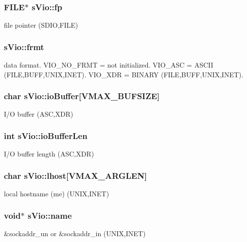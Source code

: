 \subsubsection[{fp}]{\setlength{\rightskip}{0pt plus 5cm}F\+I\+L\+E$\ast$ s\+Vio\+::fp}\label{a00002_a6ac2f825edaf90c684faebbb17ad67d4}
file pointer (S\+D\+I\+O,F\+I\+L\+E) 
\subsubsection[{frmt}]{ s\+Vio\+::frmt}\label{a00002_a6c29ebe4584937b74a3c0b449310f1ac}
data format. V\+I\+O\+\_\+\+N\+O\+\_\+\+F\+R\+M\+T = not initialized. V\+I\+O\+\_\+\+A\+S\+C = A\+S\+C\+I\+I (F\+I\+L\+E,B\+U\+F\+F,U\+N\+I\+X,I\+N\+E\+T). V\+I\+O\+\_\+\+X\+D\+R = B\+I\+N\+A\+R\+Y (F\+I\+L\+E,B\+U\+F\+F,U\+N\+I\+X,I\+N\+E\+T). 
\subsubsection[{io\+Buffer}]{\setlength{\rightskip}{0pt plus 5cm}char s\+Vio\+::io\+Buffer[{\bf V\+M\+A\+X\+\_\+\+B\+U\+F\+S\+I\+Z\+E}]}\label{a00002_aa782f06576338c4bf32af13ffa76b455}
I/\+O buffer (A\+S\+C,X\+D\+R) 
\subsubsection[{io\+Buffer\+Len}]{\setlength{\rightskip}{0pt plus 5cm}int s\+Vio\+::io\+Buffer\+Len}\label{a00002_a319b82ac4590beb7b7971822fc5ab471}
I/\+O buffer length (A\+S\+C,X\+D\+R) 
\subsubsection[{lhost}]{\setlength{\rightskip}{0pt plus 5cm}char s\+Vio\+::lhost[{\bf V\+M\+A\+X\+\_\+\+A\+R\+G\+L\+E\+N}]}\label{a00002_a8bb72a4f63380102527e19b592f70acc}
local hostname (me) (U\+N\+I\+X,I\+N\+E\+T) 
\subsubsection[{name}]{\setlength{\rightskip}{0pt plus 5cm}void$\ast$ s\+Vio\+::name}\label{a00002_ab949cc025dba7a425e9a483d7b9452be}
\&sockaddr\+\_\+un or \&sockaddr\+\_\+in (U\+N\+I\+X,I\+N\+E\+T) 
